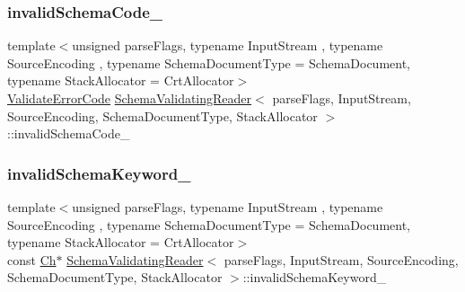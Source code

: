 \subsubsection{\texorpdfstring{invalid\+Schema\+Code\+\_\+}{invalidSchemaCode\_}}
{\footnotesize\ttfamily template$<$unsigned parse\+Flags, typename Input\+Stream , typename Source\+Encoding , typename Schema\+Document\+Type  = Schema\+Document, typename Stack\+Allocator  = Crt\+Allocator$>$ \\
\hyperlink{group__RAPIDJSON__ERRORS_ga2e1f88f94a5d9a6817a5de0ed2f0105a}{Validate\+Error\+Code} \hyperlink{classSchemaValidatingReader}{Schema\+Validating\+Reader}$<$ parse\+Flags, Input\+Stream, Source\+Encoding, Schema\+Document\+Type, Stack\+Allocator $>$\+::invalid\+Schema\+Code\+\_\+\hspace{0.3cm}{\ttfamily [private]}}

\mbox{\label{classSchemaValidatingReader_a3935c72075571724b2db127351eb39be}} 
\subsubsection{\texorpdfstring{invalid\+Schema\+Keyword\+\_\+}{invalidSchemaKeyword\_}}
{\footnotesize\ttfamily template$<$unsigned parse\+Flags, typename Input\+Stream , typename Source\+Encoding , typename Schema\+Document\+Type  = Schema\+Document, typename Stack\+Allocator  = Crt\+Allocator$>$ \\
const \hyperlink{classSchemaValidatingReader_a6eb6f887a49dbb400800ab4fc01f02c7}{Ch}$\ast$ \hyperlink{classSchemaValidatingReader}{Schema\+Validating\+Reader}$<$ parse\+Flags, Input\+Stream, Source\+Encoding, Schema\+Document\+Type, Stack\+Allocator $>$\+::invalid\+Schema\+Keyword\+\_\+\hspace{0.3cm}{\ttfamily [private]}}

\mbox{\label{classSchemaValidatingReader_a2ba358d223cd4ec6a413e64a84d3e568}} 
